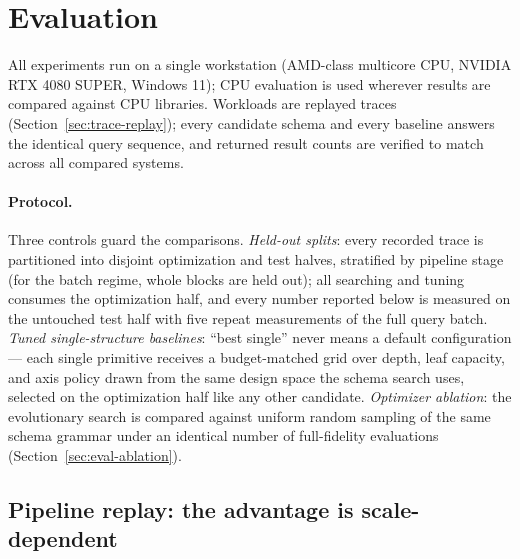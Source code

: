 \section{Evaluation}
\label{sec:evaluation}


All experiments run on a single workstation (AMD-class multicore CPU, NVIDIA RTX 4080 SUPER, Windows 11); CPU evaluation is used wherever results are compared against CPU libraries. Workloads are replayed traces (Section~\ref{sec:trace-replay}); every candidate schema and every baseline answers the identical query sequence, and returned result counts are verified to match across all compared systems.

\paragraph{Protocol.} Three controls guard the comparisons. \emph{Held-out splits}: every recorded trace is partitioned into disjoint optimization and test halves, stratified by pipeline stage (for the batch regime, whole blocks are held out); all searching and tuning consumes the optimization half, and every number reported below is measured on the untouched test half with five repeat measurements of the full query batch. \emph{Tuned single-structure baselines}: ``best single'' never means a default configuration --- each single primitive receives a budget-matched grid over depth, leaf capacity, and axis policy drawn from the same design space the schema search uses, selected on the optimization half like any other candidate. \emph{Optimizer ablation}: the evolutionary search is compared against uniform random sampling of the same schema grammar under an identical number of full-fidelity evaluations (Section~\ref{sec:eval-ablation}).

\subsection{Pipeline replay: the advantage is scale-dependent}
\label{sec:eval-pipeline}

